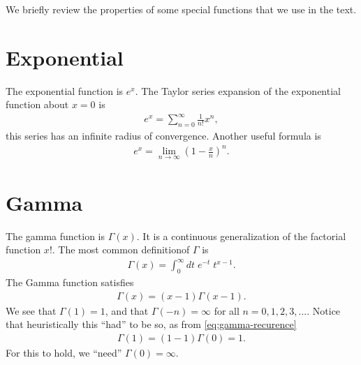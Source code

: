 We briefly review the properties of some special functions that we use in the text.

\section{Exponential}
    The exponential function is $e^x$.
The Taylor series expansion of the exponential function about $x=0$ is
\begin{align}
    e^x
    =
    \sum_{n=0}^{\infty} \frac{1}{n!}x^n
    ,
\end{align}
this series has an infinite radius of convergence.
Another useful formula is
\begin{align}
    e^x
    =
    \lim_{n\to\infty}\left(1-\frac{x}{n}\right)^n
    .
\end{align}

\section{Gamma}
The gamma function is $\Gamma\left(x\right)$.
It is a continuous generalization of the factorial function $x!$.
The most common definitionof $\Gamma$ is
\begin{align}
    \label{eq:gamma-function-definition}
    \Gamma\left(x\right)
    =
    \int_0^{\infty}dt \; e^{-t} \; t^{x-1}   
    .
\end{align}
The Gamma function satisfies
\begin{align}
    \label{eq:gamma-recurence}
    \Gamma\left(x\right)
    =
    \left(x-1\right)\Gamma\left(x-1\right)
    .
\end{align}
We see that $\Gamma\left(1\right)=1$, and that $\Gamma\left(-n\right)=\infty$ for all $n=0,1,2,3,...$.
Notice that heuristically this ``had'' to be so, as from \eqref{eq:gamma-recurence}
\begin{align}
    \Gamma\left(1\right)
    =
    \left(1-1\right)\Gamma\left(0\right)
    =
    1
    .
\end{align}
For this to hold, we ``need'' $\Gamma\left(0\right)=\infty$.

